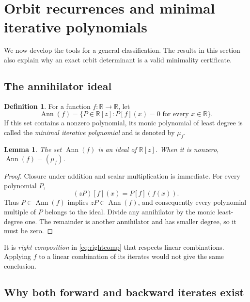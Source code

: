 \documentclass[11pt,letterpaper]{article}
\newtheorem{lemma}[theorem]{Lemma}
\theoremstyle{definition}
\newtheorem{definition}[theorem]{Definition}
\theoremstyle{remark}
\newcommand{\R}{\mathbb R}
\newcommand{\Ann}{\operatorname{Ann}}
\begin{document}
\section{Orbit recurrences and minimal iterative polynomials}
\label{sec:orbits}

We now develop the tools for a general classification. The results in this
section also explain why an exact orbit determinant is a valid
minimality certificate.

\subsection{The annihilator ideal}

\begin{definition}
For a function $f:\R\to\R$, let
\begin{equation}
  \Ann(f)=\{P\in\R[z]:P[f](x)=0\text{ for every }x\in\R\}.
\end{equation}
If this set contains a nonzero polynomial, its monic polynomial of least
degree is called the \emph{minimal iterative polynomial} and is denoted
by $\mu_f$.
\end{definition}

\begin{lemma}
\label{lem:ideal}
The set $\Ann(f)$ is an ideal of $\R[z]$. When it is nonzero,
$\Ann(f)=(\mu_f)$.
\end{lemma}

\begin{proof}
Closure under addition and scalar multiplication is immediate. For every
polynomial $P$,
\begin{equation}
  (zP)[f](x)=P[f](f(x)).
  \label{eq:rightcomp}
\end{equation}
Thus $P\in\Ann(f)$ implies $zP\in\Ann(f)$, and consequently every
polynomial multiple of $P$ belongs to the ideal. Divide any annihilator
by the monic least-degree one. The remainder is another annihilator and
has smaller degree, so it must be zero.
\end{proof}

It is \emph{right composition} in \eqref{eq:rightcomp} that respects
linear combinations. Applying $f$ to a linear combination of its iterates
would not give the same conclusion.

\subsection{Why both forward and backward iterates exist}
\end{document}
